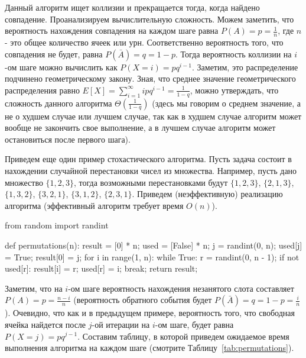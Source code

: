 Данный алгоритм ищет коллизии и прекращается тогда, когда найдено совпадение. Проанализируем
вычислительную сложность. Можем заметить, что вероятность нахождения совпадения на каждом шаге
равна $P(A) = p = \frac{1}{n}$, где $n$ - это общее количество ячеек или урн. Соответственно вероятность
того, что совпадения не будет, равна $P(\bar{A})=q=1-p$. Тогда вероятность 
коллизии на $i$-ом шаге можно вычислить как $P(X=i)=pq^{i-1}$.
Заметим, это распределение подчинено геометрическому закону.
Зная, что среднее значение геометрического распределения равно 
$E[X] = \sum_{i=1}^{\infty} ipq^{i-1} = \frac{1}{1-q}$, 
можно утверждать, что сложность данного алгоритма 
$\Theta(\frac{1}{1-q})$ (здесь мы говорим о среднем значение, а не о худшем случае или
лучшем случае, так как в худшем случае алгоритм может вообще не закончить свое 
выполнение, а в лучшем случае алгоритм может остановиться после первого шага).

Приведем еще один пример стохастического алгоритма. Пусть задача состоит в нахождении
случайной перестановки чисел из множества. Например, пусть дано множество $\{1, 2, 3\}$, 
тогда возможными перестановками будут  $\{1, 2, 3\}$, $\{2, 1, 3\}$, $\{1, 3, 2\}$,
$\{3, 2, 1\}$, $\{3, 1, 2\}$, $\{2, 3, 1\}$. Приведем (неэффективную) реализацию 
алгоритма (эффективный алгоритм требует время $O(n)$).

\begin{python}
from random import randint

def permutations(n):
	result = [0] * n;
	used = [False] * n;
	j = randint(0, n);
	used[j] = True;
	result[0] = j;
	for i in range(1, n):
		while True:
			r = randint(0, n - 1);
			if not used[r]:
				result[i] = r;
				used[r] = i;
				break;
	return result;
\end{python}

Заметим, что на $i$-ом шаге вероятность нахождения незанятого слота составляет 
$P(A) = p = \frac{n-i}{n}$ (вероятность обратного события будет 
$P(\bar{A}) = q = 1 - p =\frac{i}{n}$). Очевидно, что как и в предыдущем примере, 
вероятность того, что свободная ячейка найдется после $j$-ой итерации на $i$-ом 
шаге, будет равна $P(X=j)=pq^{j-1}$. Составим таблицу, в которой приведем 
ожидаемое время выполнения алгоритма на каждом шаге (смотрите Таблицу~\ref{tab:permutations}).

